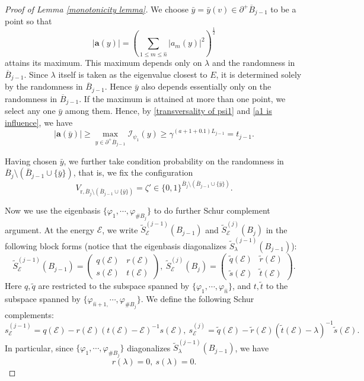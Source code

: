 \documentclass[11pt,reqno,UTF8,twoside]{amsart}
\newcommand{\bfa}{\mathbf{a}}
\newcommand{\mcE}{\mathcal{E}}
\newcommand{\mcI}{\mathcal{I}}
\newcommand{\whn}{\widehat{n}}
\newcommand{\barB}{\overline{B}}
\newcommand{\wtSj}{\widetilde{S}^{(j)}}
\newcommand{\wtSjminusone}{\widetilde{S}^{(j-1)}}
\newcommand{\smallSj}{s^{(j)}}
\newcommand{\smallSjminusone}{s^{(j-1)}}
\theoremstyle{definition}
\numberwithin{equation}{section}
\begin{document}
\begin{proof}[Proof of Lemma \ref{monotonicity lemma}]
We choose $\bar{y}=\bar{y}(v)\in\partial^+\barB_{j-1}$ to be a point so that 
\[|\bfa(y)|=\left(\sum_{1\leq m\leq \whn} |a_m(y)|^2\right)^{\frac{1}{2}}\]
 attains its maximum. This maximum depends only on $\lambda$ and the randomness in $\barB_{j-1}$. Since $\lambda$ itself is taken as the eigenvalue closest to $E$, it is determined solely by the randomness in $\barB_{j-1}$. Hence $\bar{y}$ also depends essentially only on the randomness in $\barB_{j-1}$. If the maximum is attained at more than one point, we select any one $\bar{y}$  among them. 
Hence, by \eqref{transversality of psi1} and \eqref{a1 is influence}, we have 
\begin{equation}\label{transversality of norm of bfa}
  |\bfa(\bar{y})| \geq \max_{y\in \partial ^+\barB_{j-1}} \mcI_{\psi_1} (y)  \geq \gamma^{(a+1+0.1)L_{j-1}}=t_{j-1}.
\end{equation}



Having chosen $\bar{y}$, we further take condition probability  on the randomness in $\barB_{j}\setminus(\barB_{j-1}\cup\{\bar{y}\})$, that is, we fix the configuration
\[V_{\text{r},\barB_{j}\setminus(\barB_{j-1}\cup\{\bar{y}\})}=\zeta'\in \{0,1\}^{\barB_{j}\setminus(\barB_{j-1}\cup\{\bar{y}\})}.\]







Now we use the eigenbasis $\{\varphi_1,\cdots ,\varphi_{\# B_j}\}$ to do further Schur complement argument. At the energy $\mcE$, we write $\wtSjminusone_{\mcE}(B_{j-1})$ and $\wtSj_{\mcE}(B_j)$ in the following block forms (notice that the eigenbasis diagonalizes $\wtSjminusone_{\lambda}(B_{j-1})$):
\begin{equation}\label{eigenbasis block form}
\wtSjminusone_{\mcE}(B_{j-1}) = \begin{pmatrix}
q(\mcE) & r(\mcE) \\
s(\mcE) & t(\mcE)
\end{pmatrix}, \ 
\wtSj_{\mcE} (B_{j}) = \begin{pmatrix}
\tilde{q}(\mcE) & \tilde{r}(\mcE) \\
\tilde{s}(\mcE) & \tilde{t}(\mcE)
\end{pmatrix}.
\end{equation}
Here $q,\tilde{q}$ are restricted to the subspace spanned by $\{\varphi_1,\cdots,\varphi_{\whn}\}$, and $t,\tilde{t}$ to the subspace spanned by $\{\varphi_{\whn+1,}\cdots,\varphi_{\# B_j}\}$. We define the following Schur complements:
\begin{equation}\label{eigenbasis schur complement}
   \smallSjminusone_{\mcE}=q(\mcE)-r(\mcE)(t(\mcE)-\mcE)^{-1} s(\mcE) ,\ \smallSj_{\mcE}=\tilde{q}(\mcE)-\tilde{r}(\mcE)(\tilde{t}(\mcE)-\lambda)^{-1}\tilde{s}(\mcE).
\end{equation}
In particular, since  $\{\varphi_1,\cdots,\varphi_{\# B_j }\}$ diagonalizes $\wtSjminusone_{\lambda} (B_{j-1})$, we have 
\[ r( \lambda)=0,\ s(\lambda) =0 .\]







\end{proof}
\end{document}
